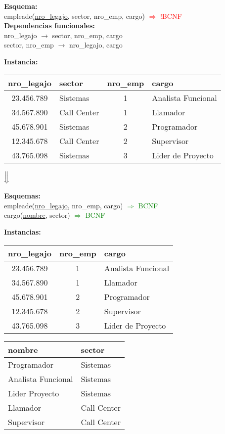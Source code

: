 \documentclass[preview]{standalone}
\begin{document}
\textbf{Esquema:}\\
empleade(\underline{nro\_legajo}, sector, nro\_emp, cargo) \textcolor{red}{$\Rightarrow$ !BCNF}\\

\textbf{Dependencias funcionales:}\\
nro\_legajo $\rightarrow$ sector, nro\_emp, cargo\\
sector, nro\_emp $\rightarrow$ nro\_legajo, cargo\\
{\color{red}{cargo $\rightarrow$ sector}}

\textbf{Instancia:}
\begin{center}
\scriptsize
\begin{tabular}{| c | l | c | l |}\hline			
	nro\_legajo & sector & nro\_emp & cargo  \\\hline			
	23.456.789 & Sistemas & 1 & Analista Funcional \\
	34.567.890 & Call Center & 1 & Llamador \\
	45.678.901 & Sistemas & 2 & Programador \\
	12.345.678 & Call Center & 2 & Supervisor \\
	43.765.098 & Sistemas & 3 & Lider de Proyecto \\\hline
\end{tabular}


$\Big\Downarrow$
\end{center}

\textbf{Esquemas:}\\
empleade(\underline{nro\_legajo}, nro\_emp, cargo) \textcolor{green}{$\Rightarrow$ BCNF}\\
cargo(\underline{nombre}, sector) \textcolor{green}{$\Rightarrow$ BCNF}

\textbf{Instancias:}
\begin{center}
\scriptsize
\begin{tabular}{| c | c | l |}\hline			
	nro\_legajo & nro\_emp & cargo  \\\hline			
	23.456.789 & 1 & Analista Funcional \\
	34.567.890 & 1 & Llamador \\
	45.678.901 & 2 & Programador \\
	12.345.678 & 2 & Supervisor \\
	43.765.098 & 3 & Lider de Proyecto \\\hline
\end{tabular}
\quad
\begin{tabular}{| l | l |}\hline
	nombre & sector \\\hline
	Programador & Sistemas\\
	Analista Funcional & Sistemas\\
	Lider Proyecto & Sistemas\\
	Llamador & Call Center\\	
	Supervisor & Call Center\\\hline		
\end{tabular}
\end{center}
\end{document}

